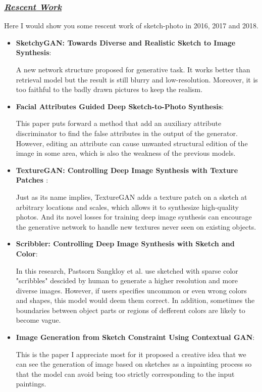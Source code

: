 \documentclass{article}
\begin{document}
\subsubsection{\underline{\textbf{\emph{Rescent Work}}}}
\indent Here I would show you some rescent work of sketch-photo in 2016, 2017 and 2018.
\begin{itemize}
\item \textbf{SketchyGAN: Towards Diverse and Realistic Sketch to Image Synthesis\cite{Chen2018SketchyGAN}}: \par
A new network structure proposed for generative task. It works better than retrieval model but the result is still blurry and low-resolution. Moreover, it is too faithful to the badly drawn pictures to keep the realism.

\item \textbf{Facial Attributes Guided Deep Sketch-to-Photo Synthesis\cite{Kazemi2018Facial}}: \par
This paper puts forward a method that add an auxiliary attribute discriminator to find the false attributes in the output of the generator. However, editing an attribute can cause unwanted structural edition of the image in some area, which is also the weakness of the previous models.

\item \textbf{TextureGAN: Controlling Deep Image Synthesis with Texture Patches \cite{Xian2017TextureGAN}}: \par
Just as its name implies, TextureGAN adds a texture patch on a sketch at arbitrary locations and scales, which allows it to synthesize high-quality photos. And its novel losses for training deep image synthesis can encourage the generative network to handle new textures never seen on existing objects.

\item \textbf{Scribbler: Controlling Deep Image Synthesis with Sketch and Color\cite{Sangkloy2016Scribbler}}: \par
In this research, Pastsorn Sangkloy et al. use sketched with sparse color "scribbles" descided by human to generate a higher resolution and more diverse images. However, if users specifies uncommon or even wrong colors and shapes, this model would deem them correct. In addition, sometimes the boundaries between object parts or regions of defferent colors are likely to become vague.


\item \textbf{Image Generation from Sketch Constraint Using Contextual GAN\cite{Lu2017Image}}: \par
This is the paper I appreciate most for it proposed a creative idea that we can see the generation of image based on sketches as a inpainting process so that the model can avoid being too strictly corresponding to the input paintings. 


\end{itemize}
\end{document}
